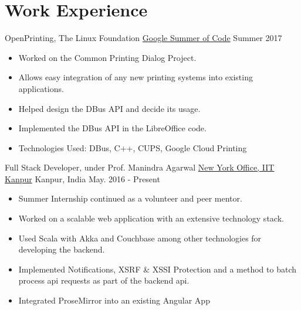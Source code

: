 \section*{\sc Work Experience}
\vspace{-2mm}
\hrulefill
\vspace{2mm}

\cventry
{OpenPrinting, The Linux Foundation}
{\href{https://yashsriv.org/2017/08/gsoc.html}{Google Summer of Code}}
{}
{Summer 2017}
{
  \begin{itemize}
  \item Worked on the Common Printing Dialog Project.
  \item Allows easy integration of any new printing systems into existing applications.
  \item Helped design the DBus API and decide its usage.
  \item Implemented the DBus API in the LibreOffice code.
  \item Technologies Used: DBus, C++, CUPS, Google Cloud Printing
  \end{itemize}
}

\cventry
{Full Stack Developer, under Prof. Manindra Agarwal}
{\href{https://yashsriv.org/2016/10/thoughts.html}{New York Office, IIT Kanpur}}
{Kanpur, India}
{May. 2016 - Present}
{
  \begin{itemize}
  \item Summer Internship continued as a volunteer and peer mentor.
  \item Worked on a scalable web application with an extensive technology stack.
  \item Used Scala with Akka and Couchbase among other technologies for
    developing the backend.
  \item	Implemented Notifications, XSRF \& XSSI Protection and a method
    to batch process api requests as part of the backend api.
  \item Integrated ProseMirror into an existing Angular App
  \end{itemize}
}
